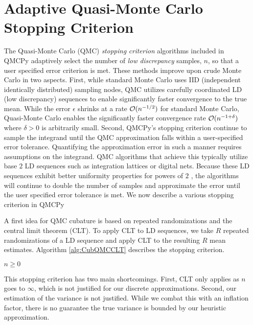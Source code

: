 \documentclass{article}
\begin{document}
\section{Adaptive Quasi-Monte Carlo Stopping Criterion}
\label{sec: Adaptive QMC SC}

The Quasi-Monte Carlo (QMC) \emph{stopping criterion} algorithms included in QMCPy adaptively select the number of \emph{low discrepancy} samples, $n$, so that a user specified error criterion is met. These methods improve upon crude Monte Carlo in two aspects. First, while standard Monte Carlo uses IID (independent identically distributed) sampling nodes, QMC utilizes carefully coordinated LD (low discrepancy) sequences to enable significantly faster convergence to the true mean. While the error $\epsilon$ shrinks at a rate $\mathcal{O}(n^{-1/2})$ for standard Monte Carlo, Quasi-Monte Carlo enables the significantly faster convergence rate $\mathcal{O}(n^{-1+\delta})$ where $\delta >0$ is arbitrarily small. Second, QMCPy's stopping criterion continue to sample the integrand until the QMC approximation falls within a user-specified error tolerance. Quantifying the approximation error in such a manner requires assumptions on the integrand. QMC algorithms that achieve this typically utilize base $2$ LD sequences such as integration lattices or digital nets. Because these LD sequences exhibit better uniformity properties for powers of $2$ , the algorithms will continue to double the number of samples and approximate the error until the user specified error tolerance is met. We now describe a various stopping criterion in QMCPy

A first idea for QMC cubature is based on repeated randomizations and the central limit theorem (CLT). To apply CLT to LD sequences, we take $R$ repeated randomizations of a LD sequence and apply CLT to the resulting $R$ mean estimates. Algorithm \ref{alg:CubQMCCLT} describes the  stopping criterion.
\begin{algorithm}
    \caption{ }\label{alg:CubQMCCLT}
    \begin{algorithmic}
    \Require $n \geq 0$
    \end{algorithmic}
\end{algorithm}
This stopping criterion has two main shortcomings. First, CLT only applies as $n$ goes to $\infty$, which is not justified for our discrete approximations. Second, our estimation of the variance is not justified. While we combat this with an inflation factor, there is no guarantee the true variance is bounded by our heuristic approximation. 
\end{document}
